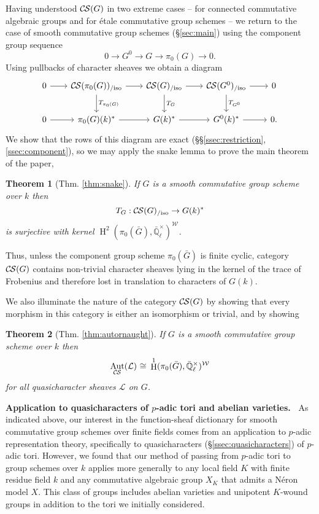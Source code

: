 \documentclass[10pt]{amsart}
\theoremstyle{plain}
\newtheorem*{theorem*}{Theorem}
\theoremstyle{definition}
\theoremstyle{remark}
\newcommand{\EE}{\mathbb{\bar Q}_\ell}
\newcommand{\Fq}{k}
\newcommand{\EEx}{\EE^\times}
\newcommand{\Weil}[1]{\mathcal{W}_{#1}}
\DeclareMathOperator{\Aut}{Aut}
\DeclareMathOperator{\Hh}{H}
\newcommand{\iso}{{\ \cong\ }}
\newcommand{\TrFrob}[1]{T_{#1}}
\newcommand{\cs}[1]{{\mathcal{#1}}}
\newcommand{\CS}{{\mathcal{C\hskip-0.8pt S}}}
\newcommand{\CSiso}[1]{\CS(#1)_{/\text{iso}}}
\newcommand{\bG}{\bar{G}}
\begin{document}
Having understood $\CS(G)$ in two extreme cases --
for connected commutative algebraic groups and for \'etale commutative group schemes -- we return to the case of smooth commutative group schemes (\S\ref{sec:main}) using the component group sequence
\[
0 \to G^0 \to G \to \pi_0(G) \to 0.
\]
Using pullbacks of character sheaves we obtain a diagram
\[
  \begin{tikzcd}[row sep=20, column sep=20]
    0 \rar & \CSiso{\pi_0(G)} \rar \dar{\TrFrob{\pi_0(G)}}
    & \CSiso{G} \rar \dar{\TrFrob{G}} & \CSiso{G^0} \rar \dar{\TrFrob{G^0}} & 0\\
    0 \rar & \pi_0(G)(\Fq)^* \rar & G(\Fq)^* \rar & G^0(\Fq)^* \rar & 0.
  \end{tikzcd}
\]
We show that the rows of this diagram are exact (\S\S\ref{ssec:restriction},\ref{ssec:component}), so we may apply the snake lemma to prove the main theorem of the paper,
\begin{theorem*}[{Thm. \ref{thm:snake}}]
If $G$ is a smooth commutative group scheme over $\Fq$ then
\[
\TrFrob{G} : \CSiso{G} \to G(\Fq)^*
\]
is surjective with kernel $\Hh^2(\pi_0(\bG),\EEx)^{\Weil{}}$.
\end{theorem*}
\noindent
Thus, unless the component group scheme $\pi_0(\bG)$ is finite cyclic, category $\CS(G)$ contains non-trivial character sheaves lying in the kernel of the trace of Frobenius and therefore lost in translation to characters of $G(\Fq)$.


We also illuminate the nature of the category $\CS(G)$ by showing that every morphism in this category is either an isomorphism or trivial, and by showing
\begin{theorem*}[{Thm. \ref{thm:autornaught}}]
If $G$ is a smooth commutative group scheme over $\Fq$ then
\[
\Aut_{\CS{}}(\cs{L}) \iso  \Hh^1(\pi_0(\bG), \EEx)^{\Weil{}}
\]
for all quasicharacter sheaves $\cs{L}$ on $G$.
\end{theorem*}

\medskip
\noindent\textbf{Application to quasicharacters of $p$-adic tori and abelian varieties.\ }
As indicated above, our interest in the function-sheaf dictionary for smooth commutative group schemes
over finite fields comes from an application to $p$-adic representation theory,
specifically to quasicharacters (\S\ref{ssec:quasicharacters}) of $p$-adic tori.
However, we found that our method of passing from $p$-adic tori to group schemes over $\Fq$ applies more generally to
any local field $K$ with finite residue field $\Fq$ and any commutative algebraic group $X_K$ that admits a N\'eron model $X$.
This class of groups includes abelian varieties and unipotent $K$-wound groups in addition to the tori we initially considered.
\end{document}
